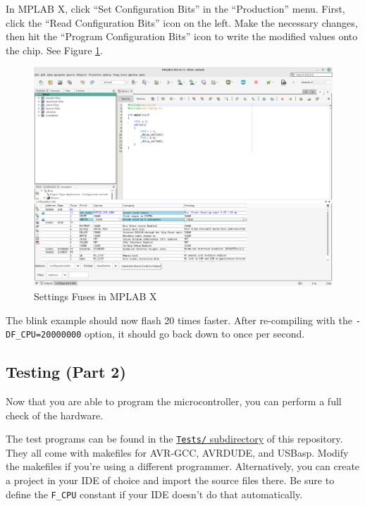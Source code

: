 \documentclass{article}
\newcommand{\file}[1]{\texttt{#1}}
\begin{document}
In MPLAB X, click ``Set Configuration Bits'' in the ``Production'' menu. First, click the ``Read Configuration Bits'' icon on the left. Make the necessary changes, then hit the ``Program Configuration Bits'' icon to write the modified values onto the chip. See Figure \ref{fig:mplabXFuses}. 

\begin{figure}[htb]
\centering
\includegraphics[width=\textwidth]{Pictures/MPLABXFuses.png}
\caption{Settings Fuses in MPLAB X}
\label{fig:mplabXFuses}
\end{figure}

The blink example should now flash 20 times faster. After re-compiling with the \lstinline[language=bash]{-DF_CPU=20000000} option, it should go back down to once per second. 
\FloatBarrier

\subsection{Testing (Part 2)}
Now that you are able to program the microcontroller, you can perform a full check of the hardware. 

The test programs can be found in the \href{../Tests/}{\file{Tests/} subdirectory} of this repository. They all come with makefiles for AVR-GCC, AVRDUDE, and USBasp. Modify the makefiles if you're using a different programmer. Alternatively, you can create a project in your IDE of choice and import the source files there. Be sure to define the \lstinline[language=C]{F_CPU} constant if your IDE doesn't do that automatically.
\end{document}
